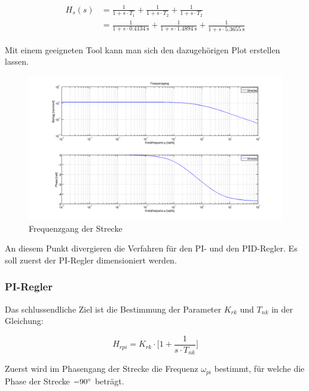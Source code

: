 \begin{gather} \label{eq:transfer:plant}
    \begin{split}
        H_s (s) & = \frac{1}{1 + s \cdot T_1}
                  + \frac{1}{1 + s \cdot T_2}
                  + \frac{1}{1 + s \cdot T_2}                     \\
                & = \frac{1}{1 + s \cdot \SI{0.4134}{\second}}
                  + \frac{1}{1 + s \cdot \SI{1.4894}{\second}}
                  + \frac{1}{1 + s \cdot \SI{5.3655}{\second}}
    \end{split}
\end{gather}

Mit einem  geeigneten Tool  kann man sich  den dazugeh\"origen  Plot erstellen
lassen.

\begin{figure}[h! width=\pagewidth]
    \includegraphics[width=.9\textwidth]{images/streckeFrequenzgang.png}
    \caption{%
        Frequenzgang der Strecke%
    }
    \label{fig:plant_freq}
\end{figure}

An diesem Punkt divergieren die Verfahren f\"ur den PI- und den PID-Regler. Es
soll zuerst der PI-Regler dimensioniert werden.

\subsubsection*{PI-Regler}

Das schlussendliche Ziel ist die Bestimmung der Parameter $K_{rk}$ und $T_{nk}$
in der Gleichung:

\begin{equation} \label{eq:pi:target}
    H_{rpi} = K_{rk} \cdot \Big[ 1 + \frac{1}{s \cdot T_{nk}} \Big]
\end{equation}

Zuerst wird im Phasengang der Strecke die Frequenz $\omega_{pi}$ bestimmt, f\"ur
welche die Phase der Strecke $-90\degree$ betr\"agt.

